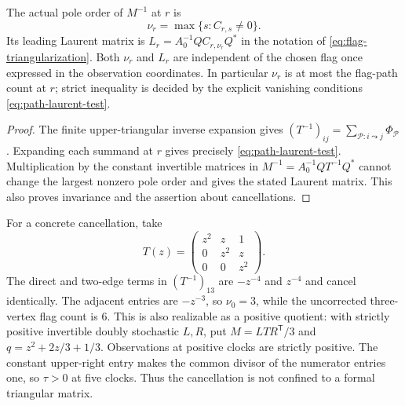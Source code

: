 \begin{proposition}\label{prop:flag-pole-test}
The actual pole order of $M^{-1}$ at $r$ is
\[
 \nu_r=\max\{s:C_{r,s}\ne0\}.
\]
Its leading Laurent matrix is
$L_r=A_0^{-1}Q C_{r,\nu_r}Q^*$ in the notation of
\eqref{eq:flag-triangularization}. Both $\nu_r$ and $L_r$ are
independent of the chosen flag once expressed in the observation
coordinates. In particular $\nu_r$ is at most the flag-path count at
$r$; strict inequality is decided by the explicit vanishing conditions
\eqref{eq:path-laurent-test}.
\end{proposition}
\begin{proof}
The finite upper-triangular inverse expansion gives
$(T^{-1})_{ij}=\sum_{\mathcal P:i\leadsto j}\Phi_{\mathcal P}$.
Expanding each summand at $r$ gives precisely
\eqref{eq:path-laurent-test}. Multiplication by the constant invertible
matrices in $M^{-1}=A_0^{-1}QT^{-1}Q^*$ cannot change the largest
nonzero pole order and gives the stated Laurent matrix. This also
proves invariance and the assertion about cancellations.
\end{proof}

For a concrete cancellation, take
\[
 T(z)=\begin{pmatrix}z^2&z&1\\0&z^2&z\\0&0&z^2\end{pmatrix}.
\]
The direct and two-edge terms in $(T^{-1})_{13}$ are
$-z^{-4}$ and $z^{-4}$ and cancel identically. The adjacent entries
are $-z^{-3}$, so $\nu_0=3$, while the uncorrected three-vertex
flag count is $6$. This is also realizable as a positive quotient:
with strictly positive invertible doubly stochastic $L,R$, put
$M=LTR^{\mathsf T}/3$ and
$q=z^2+2z/3+1/3$. Observations at positive clocks are strictly
positive. The constant upper-right entry makes the common divisor of
the numerator entries one, so $\tau>0$ at five clocks. Thus the
cancellation is not confined to a formal triangular matrix.

